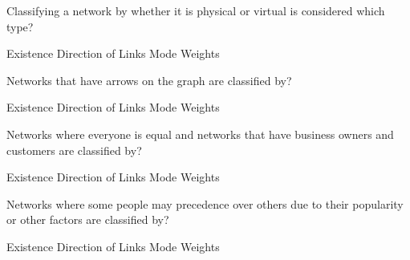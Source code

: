 \documentclass[theme=sleek, randomorder, hidesidemenu]{webquiz}
\begin{document}
\begin{question}
  Classifying a network by whether it is physical or virtual is considered which type?
  \begin{choice}
    \correct Existence
    \incorrect Direction of Links
    \incorrect Mode
    \incorrect Weights
  \end{choice}
\end{question}

\begin{question}
  Networks that have arrows on the graph are classified by?
  \begin{choice}
    \incorrect Existence
    \correct Direction of Links
    \incorrect Mode
    \incorrect Weights
  \end{choice}
\end{question}

\begin{question}
  Networks where everyone is equal and networks that have business owners and customers are classified by?
  \begin{choice}
    \incorrect Existence
    \incorrect Direction of Links
    \correct Mode
    \incorrect Weights
  \end{choice}
\end{question}

\begin{question}
  Networks where some people may precedence over others due to their popularity or other factors are classified by?
  \begin{choice}
    \incorrect Existence
    \incorrect Direction of Links
    \incorrect Mode
    \correct Weights
  \end{choice}
\end{question}
\end{document}
